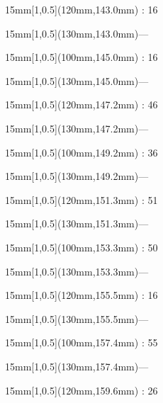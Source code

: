 \documentclass[a4paper]{memoir}
\begin{document}
\begin{textblock*}{15mm}[1,0.5](120mm,143.0mm) : 16\end{textblock*}
\begin{textblock*}{15mm}[1,0.5](130mm,143.0mm)\flushright —\end{textblock*}
\begin{textblock*}{15mm}[1,0.5](100mm,145.0mm) : 16\end{textblock*}
\begin{textblock*}{15mm}[1,0.5](130mm,145.0mm)\flushright —\end{textblock*}
\begin{textblock*}{15mm}[1,0.5](120mm,147.2mm) : 46\end{textblock*}
\begin{textblock*}{15mm}[1,0.5](130mm,147.2mm)\flushright —\end{textblock*}
\begin{textblock*}{15mm}[1,0.5](100mm,149.2mm) : 36\end{textblock*}
\begin{textblock*}{15mm}[1,0.5](130mm,149.2mm)\flushright —\end{textblock*}
\begin{textblock*}{15mm}[1,0.5](120mm,151.3mm) : 51\end{textblock*}
\begin{textblock*}{15mm}[1,0.5](130mm,151.3mm)\flushright —\end{textblock*}
\begin{textblock*}{15mm}[1,0.5](100mm,153.3mm) : 50\end{textblock*}
\begin{textblock*}{15mm}[1,0.5](130mm,153.3mm)\flushright —\end{textblock*}
\begin{textblock*}{15mm}[1,0.5](120mm,155.5mm) : 16\end{textblock*}
\begin{textblock*}{15mm}[1,0.5](130mm,155.5mm)\flushright —\end{textblock*}
\begin{textblock*}{15mm}[1,0.5](100mm,157.4mm) : 55\end{textblock*}
\begin{textblock*}{15mm}[1,0.5](130mm,157.4mm)\flushright —\end{textblock*}
\begin{textblock*}{15mm}[1,0.5](120mm,159.6mm) : 26\end{textblock*}
\end{document}
